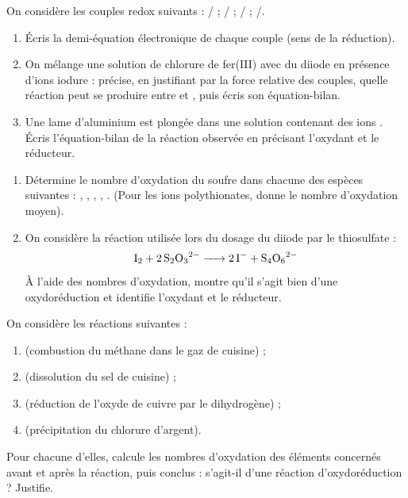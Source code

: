\documentclass[11pt]{article}
\newcounter{popsec}
\newcounter{popsub}
\newcommand{\courssub}[1]{%
  \stepcounter{popsub}%
  \par\vspace{9pt}\noindent{\popxbold\fontsize{11.5}{13}\selectfont\color{popink}{\color{poporange}\thepopsec.\thepopsub}\hspace{6pt}#1}\par\nopagebreak\vspace{4pt}
}
\begin{document}
\courssub{Je m'entraîne}

\begin{exercice}
On considère les couples redox suivants : / ; / ; / ; /.
\begin{enumerate}
\item Écris la demi-équation électronique de chaque couple (sens de la réduction).
\item On mélange une solution de chlorure de fer(III) avec du diiode en présence d'ions iodure : précise, en justifiant par la force relative des couples, quelle réaction peut se produire entre  et , puis écris son équation-bilan.
\item Une lame d'aluminium est plongée dans une solution contenant des ions . Écris l'équation-bilan de la réaction observée en précisant l'oxydant et le réducteur.
\end{enumerate}
\end{exercice}

\begin{exercice}
\begin{enumerate}
\item Détermine le nombre d'oxydation du soufre dans chacune des espèces suivantes : , , , , . (Pour les ions polythionates, donne le nombre d'oxydation moyen).
\item On considère la réaction utilisée lors du dosage du diiode par le thiosulfate :
\[ \ce{I2 + 2 S2O3^2- -> 2 I- + S4O6^2-} \]
À l'aide des nombres d'oxydation, montre qu'il s'agit bien d'une oxydoréduction et identifie l'oxydant et le réducteur.
\end{enumerate}
\end{exercice}

\begin{exercice}
On considère les réactions suivantes :
\begin{enumerate}
\item {} (combustion du méthane dans le gaz de cuisine) ;
\item {} (dissolution du sel de cuisine) ;
\item {} (réduction de l'oxyde de cuivre par le dihydrogène) ;
\item {} (précipitation du chlorure d'argent).
\end{enumerate}
Pour chacune d'elles, calcule les nombres d'oxydation des éléments concernés avant et après la réaction, puis conclus : s'agit-il d'une réaction d'oxydoréduction ? Justifie.
\end{exercice}
\end{document}

